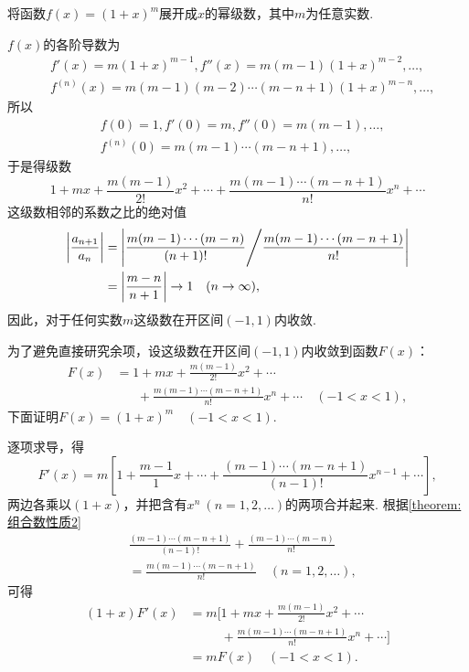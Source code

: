 \begin{example}
将函数\(f(x) = (1+x)^m\)展开成\(x\)的幂级数，其中\(m\)为任意实数.
\begin{solution}
\(f(x)\)的各阶导数为\[
\begin{split}
&f'(x) = m (1+x)^{m-1},
f''(x) = m(m-1) (1+x)^{m-2},
\dotsc, \\
&f^{(n)}(x) = m(m-1)(m-2)\dotsm(m-n+1) (1+x)^{m-n},
\dotsc,
\end{split}
\]所以\[
\begin{split}
&f(0) = 1,
f'(0) = m,
f''(0) = m(m-1),
\dotsc, \\
&f^{(n)}(0) = m(m-1)\dotsm(m-n+1),\dotsc,
\end{split}
\]于是得级数\[
1+mx+\frac{m(m-1)}{2!}x^2+\dotsb+\frac{m(m-1)\dotsm(m-n+1)}{n!}x^n+\dotsb
\]这级数相邻的系数之比的绝对值\[
\begin{split}
\abs{\frac{a_{n+1}}{a_n}}
&= \abs{ \frac{m(m-1)\dotsm(m-n)}{(n+1)!} \Bigg/ \frac{m(m-1)\dotsm(m-n+1)}{n!} } \\
&= \abs{ \frac{m-n}{n+1} }
\to 1 \quad (n\to\infty),
\end{split}
\]因此，对于任何实数\(m\)这级数在开区间\((-1,1)\)内收敛.

为了避免直接研究余项，设这级数在开区间\((-1,1)\)内收敛到函数\(F(x)\)：\[
\begin{split}
F(x) &= 1+mx+\frac{m(m-1)}{2!}x^2+\dotsb \\
    &\hspace{20pt}+\frac{m(m-1)\dotsm(m-n+1)}{n!}x^n+\dotsb
    \quad (-1<x<1),
\end{split}
\]下面证明\(F(x) = (1+x)^m \quad (-1<x<1)\).

逐项求导，得\[
F'(x) = m \left[
    1+\frac{m-1}{1}x+\dotsb+\frac{(m-1)\dotsm(m-n+1)}{(n-1)!}x^{n-1}+\dotsb
\right],
\]两边各乘以\((1+x)\)，并把含有\(x^n\ (n=1,2,\dotsc)\)的两项合并起来.
根据\cref{theorem:组合数性质2} \[
\begin{split}
&\frac{(m-1)\dotsm(m-n+1)}{(n-1)!}
	+ \frac{(m-1)\dotsm(m-n)}{n!} \\
&= \frac{m(m-1)\dotsm(m-n+1)}{n!}
	\quad (n=1,2,\dotsc),
\end{split}
\]可得\[
\begin{split}
(1+x) F'(x)
&= m \Biggl[
1+mx+\frac{m(m-1)}{2!}x^2+\dotsb \\
&\hspace{30pt} +\frac{m(m-1)\dotsm(m-n+1)}{n!}x^n+\dotsb
\Biggr] \\
&= m F(x)
\quad (-1<x<1).
\end{split}
\]


\end{solution}
\end{example}
